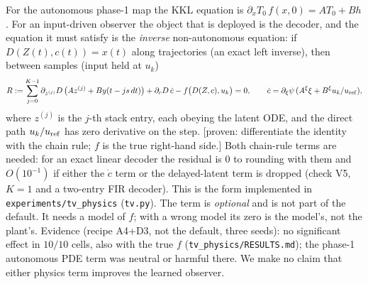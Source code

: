 \begin{remark}\label{rem:m1-tv}
 For the autonomous phase-1
map the KKL equation is $\partial_xT_0\,f(x,0)=AT_0+Bh$. For an input-driven observer the object that is deployed is the
decoder, and the equation it must satisfy is the \emph{inverse} non-autonomous equation: if $D(Z(t),c(t))=x(t)$ along
trajectories (an exact left inverse), then between samples (input held at $u_k$)
\[
R:=\sum_{j=0}^{K-1}\partial_{z^{(j)}}D\,\big(Az^{(j)}+By(t-js\,dt)\big)+\partial_cD\,\dot c-f\big(D(Z,c),u_k\big)=0,\qquad
\dot c=\partial_\xi\psi\,(A^\xi\xi+B^\xi u_k/u_{\rm ref}),
\]
where $z^{(j)}$ is the $j$-th stack entry, each obeying the latent ODE, and the direct path $u_k/u_{\rm ref}$ has zero
derivative on the step. [proven: differentiate the identity with the chain rule; $f$ is the true right-hand side.] Both
chain-rule terms are needed: for an exact linear decoder the residual is $0$ to rounding with them and $O(10^{-1})$ if
either the $\dot c$ term or the delayed-latent term is dropped (check V5, $K=1$ and a two-entry FIR decoder). This is the
form implemented in \texttt{experiments/tv\_physics} (\texttt{tv.py}). The term is \emph{optional} and is not part of
the default. It needs a model of $f$; with a wrong model its zero is the model's, not the plant's. Evidence (recipe
A4+D3, not the default, three seeds): no significant effect in $10/10$ cells, also with the true $f$
(\texttt{tv\_physics/RESULTS.md}); the phase-1 autonomous PDE term was neutral or harmful there. We make no claim that
either physics term improves the learned observer.
\end{remark}

